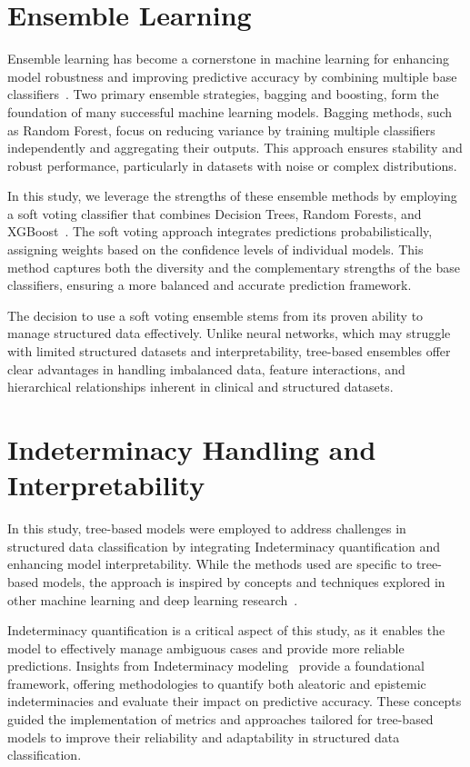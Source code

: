 \section{Ensemble Learning}

Ensemble learning has become a cornerstone in machine learning for enhancing model robustness and improving predictive accuracy by combining multiple base classifiers~\cite{9893798}. Two primary ensemble strategies, bagging and boosting, form the foundation of many successful machine learning models. Bagging methods, such as Random Forest, focus on reducing variance by training multiple classifiers independently and aggregating their outputs. This approach ensures stability and robust performance, particularly in datasets with noise or complex distributions.

In this study, we leverage the strengths of these ensemble methods by employing a soft voting classifier that combines Decision Trees, Random Forests, and XGBoost~\cite{Kim2018AutomatedML, Interpretable_tree_ensemble}. The soft voting approach integrates predictions probabilistically, assigning weights based on the confidence levels of individual models. This method captures both the diversity and the complementary strengths of the base classifiers, ensuring a more balanced and accurate prediction framework.

The decision to use a soft voting ensemble stems from its proven ability to manage structured data effectively. Unlike neural networks, which may struggle with limited structured datasets and interpretability, tree-based ensembles offer clear advantages in handling imbalanced data, feature interactions, and hierarchical relationships inherent in clinical and structured datasets.

\section{Indeterminacy Handling and Interpretability}

In this study, tree-based models were employed to address challenges in structured data classification by integrating Indeterminacy quantification and enhancing model interpretability. While the methods used are specific to tree-based models, the approach is inspired by concepts and techniques explored in other machine learning and deep learning research~\cite{Uncertainty_Quantification}.

Indeterminacy quantification is a critical aspect of this study, as it enables the model to effectively manage ambiguous cases and provide more reliable predictions. Insights from Indeterminacy modeling~\cite{Uncertainty_Quantification_2}  provide a foundational framework, offering methodologies to quantify both aleatoric and epistemic indeterminacies and evaluate their impact on predictive accuracy. These concepts guided the implementation of metrics and approaches tailored for tree-based models to improve their reliability and adaptability in structured data classification.

